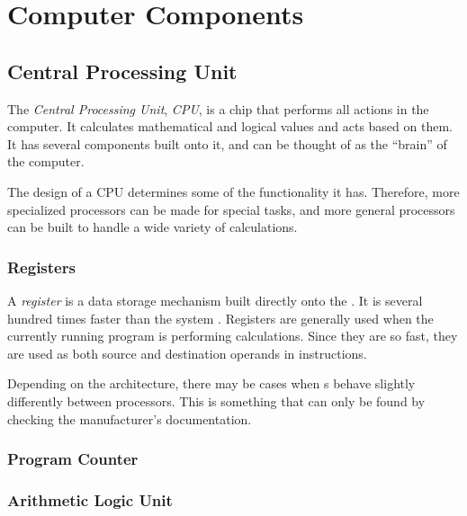 \section{Computer Components}\label{app:Computer_Components}
\subsection{Central Processing Unit}\label{subsec:CPU}
\begin{definition}\label{def:CPU}
  The \emph{Central Processing Unit}, \emph{CPU}, is a chip that performs all actions in the computer.
  It calculates mathematical and logical values and acts based on them.
  It has several components built onto it, and can be thought of as the ``brain'' of the computer.

  The design of a CPU determines some of the functionality it has.
  Therefore, more specialized processors can be made for special tasks, and more general processors can be built to handle a wide variety of calculations.
\end{definition}

\subsubsection{Registers}\label{subsubsec:Registers}
\begin{definition}[Register]\label{def:Register}
  A \emph{register} is a data storage mechanism built directly onto the .
  It is several hundred times faster than the system .
  Registers are generally used when the currently running program is performing calculations.
  Since they are so fast, they are used as both source and destination operands in instructions.

  \begin{remark}
    Depending on the  architecture, there may be cases when s behave slightly differently between processors.
    This is something that can only be found by checking the  manufacturer's documentation.
  \end{remark}
\end{definition}

\subsubsection{Program Counter}\label{subsubsec:Program_Counter}
\subsubsection{Arithmetic Logic Unit}\label{subsubsec:ALU}
